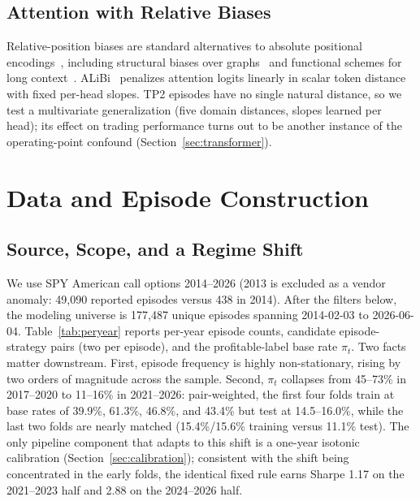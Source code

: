 \documentclass[sigconf,review,anonymous]{acmart}
\begin{document}
\subsection{Attention with Relative Biases}
Relative-position biases are standard alternatives to absolute positional encodings~\cite{shaw2018self,raffel2020t5}, including structural biases over graphs~\cite{ying2021graphormer} and functional schemes for long context~\cite{li2024fire}. ALiBi~\cite{press2022alibi} penalizes attention logits linearly in scalar token distance with fixed per-head slopes. TP2 episodes have no single natural distance, so we test a multivariate generalization (five domain distances, slopes learned per head); its effect on trading performance turns out to be another instance of the operating-point confound (Section~\ref{sec:transformer}).

\section{Data and Episode Construction}
\label{sec:data}

\subsection{Source, Scope, and a Regime Shift}
\label{sec:data-source}
We use SPY American call options 2014--2026 (2013 is excluded as a vendor anomaly: 49{,}090 reported episodes versus 438 in 2014). After the filters below, the modeling universe is 177{,}487 unique episodes spanning 2014-02-03 to 2026-06-04. Table~\ref{tab:peryear} reports per-year episode counts, candidate episode-strategy pairs (two per episode), and the profitable-label base rate $\pi_t$. Two facts matter downstream. First, episode frequency is highly non-stationary, rising by two orders of magnitude across the sample. Second, $\pi_t$ collapses from 45--73\% in 2017--2020 to 11--16\% in 2021--2026: pair-weighted, the first four folds train at base rates of 39.9\%, 61.3\%, 46.8\%, and 43.4\% but test at 14.5--16.0\%, while the last two folds are nearly matched (15.4\%/15.6\% training versus 11.1\% test). The only pipeline component that adapts to this shift is a one-year isotonic calibration (Section~\ref{sec:calibration}); consistent with the shift being concentrated in the early folds, the identical fixed rule earns Sharpe 1.17 on the 2021--2023 half and 2.88 on the 2024--2026 half.
\end{document}
